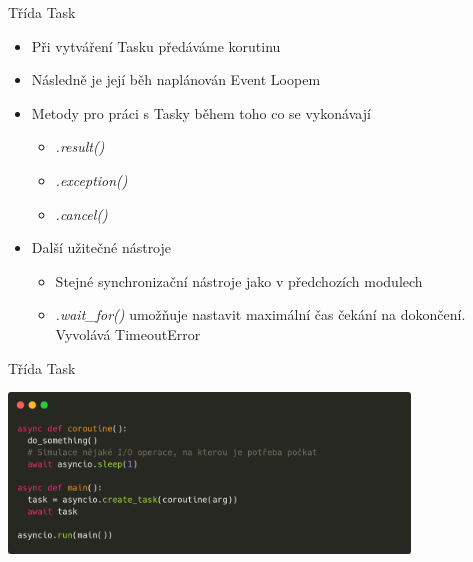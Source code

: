 \documentclass{beamer}
\begin{document}
\begin{frame}{Třída Task}
    \begin{itemize}
        \item Při vytváření Tasku předáváme korutinu
        \item Následně je její běh naplánován Event Loopem
        \item Metody pro práci s Tasky během toho co se vykonávají
        \begin{itemize}
            \item \textit{.result()}
            \item \textit{.exception()}
            \item \textit{.cancel()}
        \end{itemize}
        
        \vskip 0.25in
        \item Další užitečné nástroje
        \begin{itemize}
            \item Stejné synchronizační nástroje jako v předchozích modulech

            \item \textit{.wait\_for()} umožňuje nastavit maximální čas čekání na dokončení. Vyvolává TimeoutError
        \end{itemize}
    \end{itemize}
\end{frame}

\begin{frame}[fragile]{Třída Task}
    \scriptsize
    \begin{center}
        \includegraphics[width=0.8\textwidth]{obrazky/codes/carbon9.png}
    \end{center}
\end{frame}
\end{document}
